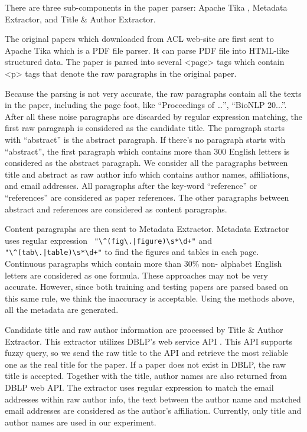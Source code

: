 \documentclass[11pt,letterpaper]{article}
\begin{document}
There are three sub-components in the paper parser: Apache Tika , Metadata Extractor, and Title \& Author Extractor. 

The original papers which downloaded from ACL web-site are first sent to Apache Tika which is a PDF file parser. It can parse PDF file into HTML-like structured data. The paper is parsed into several <page> tags which contain <p> tags that denote the raw paragraphs in the original paper. 

Because the parsing is not very accurate, the raw paragraphs contain all the texts in the paper, including the page foot, like ``Proceedings of …'', ``BioNLP 20...''. After all these noise paragraphs are discarded by regular expression matching, the first raw paragraph is considered as the candidate title. The paragraph starts with ``abstract'' is the abstract paragraph. If there’s no paragraph starts with ``abstract'', the first paragraph which contains more than 300 English letters is considered as the abstract paragraph. 
We consider all the paragraphs between title and abstract as raw author info which contains author names, affiliations, and email addresses. All paragraphs after the key-word ``reference'' or ``references'' are considered as paper references. The other paragraphs between abstract and references are considered as content paragraphs. 

Content paragraphs are then sent to Metadata Extractor. Metadata Extractor uses regular expression \verb- "\^(fig\.|figure)\s*\d+"- and  \verb-"\^(tab\.|table)\s*\d+"- to find the figures and tables in each page. Continuous paragraphs which contain more than 30\% non- alphabet English letters are considered as one formula. These approaches may not be very accurate. However, since both training and testing papers are parsed based on this same rule, we think the inaccuracy is acceptable. Using the methods above, all the metadata are generated. 

Candidate title and raw author information are processed by Title \& Author Extractor. This extractor utilizes DBLP’s web service API . This API supports fuzzy query, so we send the raw title to the API and retrieve the most reliable one as the real title for the paper. If a paper does not exist in DBLP, the raw title is accepted. Together with the title, author names are also returned from DBLP web API. The extractor uses regular expression to match the email addresses within raw author info, the text between the author name and matched email addresses are considered as the author’s affiliation. Currently, only title and author names are used in our experiment. 
\end{document}
